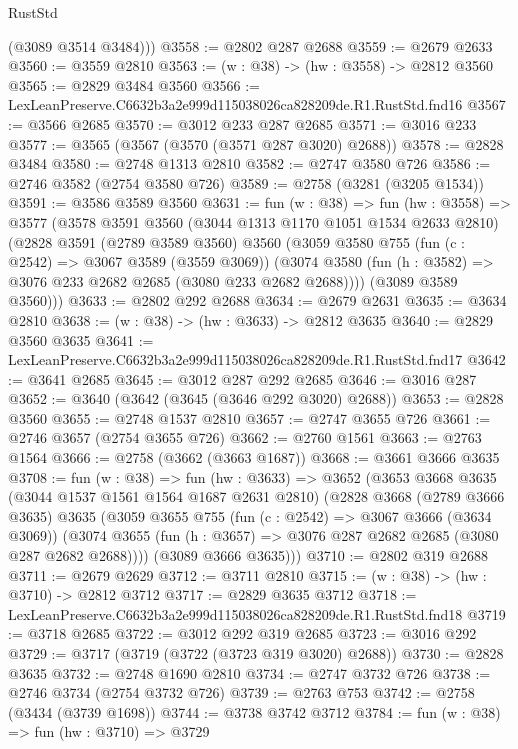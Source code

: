 \begin{lexlean}{RustStd}
\begin{coremodule}
        (@3089 @3514 @3484)))
@3558 := @2802 @287 @2688
@3559 := @2679 @2633
@3560 := @3559 @2810
@3563 := (w : @38) -> (hw : @3558) -> @2812 @3560
@3565 := @2829 @3484 @3560
@3566 := LexLeanPreserve.C6632b3a2e999d115038026ca828209de.R1.RustStd.fnd16
@3567 := @3566 @2685
@3570 := @3012 @233 @287 @2685
@3571 := @3016 @233
@3577 := @3565 (@3567 (@3570 (@3571 @287 @3020) @2688))
@3578 := @2828 @3484
@3580 := @2748 @1313 @2810
@3582 := @2747 @3580 @726
@3586 := @2746 @3582 (@2754 @3580 @726)
@3589 := @2758 (@3281 (@3205 @1534))
@3591 := @3586 @3589 @3560
@3631 := fun (w : @38) =>
  fun (hw : @3558) =>
  @3577
    (@3578
      @3591
      @3560
      (@3044 @1313 @1170 @1051 @1534 @2633 @2810)
      (@2828
        @3591
        (@2789 @3589 @3560)
        @3560
        (@3059
          @3580
          @755
          (fun (c : @2542) => @3067 @3589 (@3559 @3069))
          (@3074 @3580 (fun (h : @3582) => @3076 @233 @2682 @2685 (@3080 @233 @2682 @2688))))
        (@3089 @3589 @3560)))
@3633 := @2802 @292 @2688
@3634 := @2679 @2631
@3635 := @3634 @2810
@3638 := (w : @38) -> (hw : @3633) -> @2812 @3635
@3640 := @2829 @3560 @3635
@3641 := LexLeanPreserve.C6632b3a2e999d115038026ca828209de.R1.RustStd.fnd17
@3642 := @3641 @2685
@3645 := @3012 @287 @292 @2685
@3646 := @3016 @287
@3652 := @3640 (@3642 (@3645 (@3646 @292 @3020) @2688))
@3653 := @2828 @3560
@3655 := @2748 @1537 @2810
@3657 := @2747 @3655 @726
@3661 := @2746 @3657 (@2754 @3655 @726)
@3662 := @2760 @1561
@3663 := @2763 @1564
@3666 := @2758 (@3662 (@3663 @1687))
@3668 := @3661 @3666 @3635
@3708 := fun (w : @38) =>
  fun (hw : @3633) =>
  @3652
    (@3653
      @3668
      @3635
      (@3044 @1537 @1561 @1564 @1687 @2631 @2810)
      (@2828
        @3668
        (@2789 @3666 @3635)
        @3635
        (@3059
          @3655
          @755
          (fun (c : @2542) => @3067 @3666 (@3634 @3069))
          (@3074 @3655 (fun (h : @3657) => @3076 @287 @2682 @2685 (@3080 @287 @2682 @2688))))
        (@3089 @3666 @3635)))
@3710 := @2802 @319 @2688
@3711 := @2679 @2629
@3712 := @3711 @2810
@3715 := (w : @38) -> (hw : @3710) -> @2812 @3712
@3717 := @2829 @3635 @3712
@3718 := LexLeanPreserve.C6632b3a2e999d115038026ca828209de.R1.RustStd.fnd18
@3719 := @3718 @2685
@3722 := @3012 @292 @319 @2685
@3723 := @3016 @292
@3729 := @3717 (@3719 (@3722 (@3723 @319 @3020) @2688))
@3730 := @2828 @3635
@3732 := @2748 @1690 @2810
@3734 := @2747 @3732 @726
@3738 := @2746 @3734 (@2754 @3732 @726)
@3739 := @2763 @753
@3742 := @2758 (@3434 (@3739 @1698))
@3744 := @3738 @3742 @3712
@3784 := fun (w : @38) =>
  fun (hw : @3710) =>
  @3729

\end{coremodule}
\end{lexlean}
